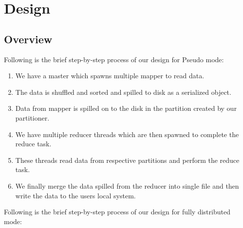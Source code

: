 \documentclass{article}
\begin{document}
\section{Design}

\subsection{Overview}

Following is the brief step-by-step process of our design for Pseudo mode:

\begin{enumerate}
    \item We have a master which spawns multiple mapper to read data.
    \item The data is shuffled and sorted and spilled to disk as a serialized object.
    \item Data from mapper is spilled on to the disk in the partition created by our partitioner.
    \item We have multiple reducer threads which are then spawned to complete the reduce task.
    \item These threads read data from respective partitions and perform the reduce task.
    \item We finally merge the data spilled from the reducer into single file and then write the data to the users local system.
\end{enumerate}

Following is the brief step-by-step process of our design for fully distributed mode:
\end{document}

